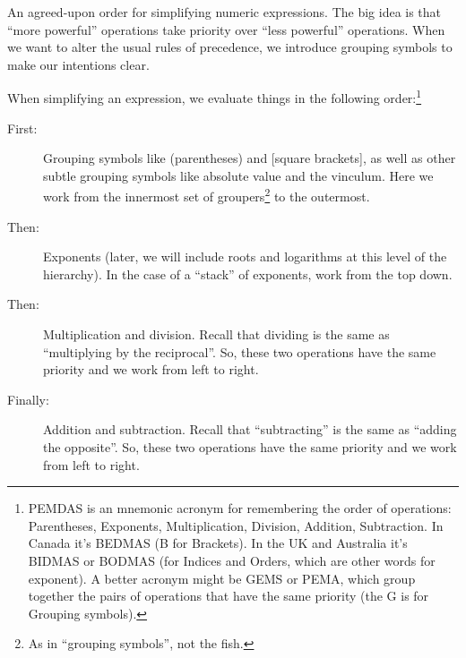 \begin{boxdef}
An agreed-upon order for simplifying numeric expressions. The big idea is that ``more powerful'' operations take priority over ``less powerful'' operations. When we want to alter the usual rules of precedence, we introduce grouping symbols to make our intentions clear.

When simplifying an expression, we evaluate things in the following order:\footnote{PEMDAS is an mnemonic acronym for remembering the order of operations: Parentheses, Exponents, Multiplication, Division, Addition, Subtraction. In Canada it's BEDMAS (B for Brackets). In the UK and Australia it's BIDMAS or BODMAS (for Indices and Orders, which are other words for exponent). A better acronym might be GEMS or PEMA, which group together the pairs of operations that have the same priority (the G is for Grouping symbols).}

\begin{description}
\item[First:] Grouping symbols like (parentheses) and [square brackets], as well as other subtle grouping symbols like absolute value and the vinculum. Here we work from the innermost set of groupers\footnote{As in ``grouping symbols'', not the fish.} to the outermost.

\item[Then:] Exponents (later, we will include roots and logarithms at this level of the hierarchy). In the case of a ``stack'' of exponents, work from the top down.

\item[Then:] Multiplication and division. Recall that dividing is the same as ``multiplying by the reciprocal''. So, these two operations have the same priority and we work from left to right.

\item[Finally:] Addition and subtraction. Recall that ``subtracting'' is the same as ``adding the opposite''. So, these two operations have the same priority and we work from left to right.
\end{description}
\end{boxdef}

